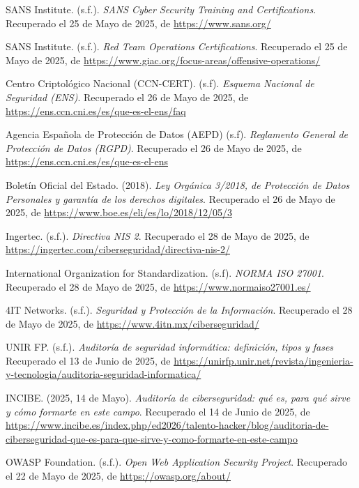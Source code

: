 \documentclass[a4paper, 11pt]{article}
\begin{document}
\begin{thebibliography}{99}
    SANS Institute. (s.f.). \textit{SANS Cyber Security Training and Certifications}. Recuperado el 25 de Mayo de 2025, de \url{https://www.sans.org/}

    SANS Institute. (s.f.). \textit{Red Team Operations Certifications}. Recuperado el 25 de Mayo de 2025, de \url{https://www.giac.org/focus-areas/offensive-operations/}

    Centro Criptológico Nacional (CCN-CERT). (s.f). \textit{Esquema Nacional de Seguridad (ENS)}. Recuperado el 26 de Mayo de 2025, de \url{https://ens.ccn.cni.es/es/que-es-el-ens/faq}

    Agencia Española de Protección de Datos (AEPD) (s.f). \textit{Reglamento General de Protección de Datos (RGPD)}. Recuperado el 26 de Mayo de 2025, de \url{https://ens.ccn.cni.es/es/que-es-el-ens}

    Boletín Oficial del Estado. (2018). \textit{Ley Orgánica 3/2018, de Protección de Datos Personales y garantía de los derechos digitales}. Recuperado el 26 de Mayo de 2025, de \url{https://www.boe.es/eli/es/lo/2018/12/05/3}

    Ingertec. (s.f.). \textit{Directiva NIS 2}. Recuperado el 28 de Mayo de 2025, de \url{https://ingertec.com/ciberseguridad/directiva-nis-2/}

    International Organization for Standardization. (s.f). \textit{NORMA ISO 27001}. Recuperado el 28 de Mayo de 2025, de \url{https://www.normaiso27001.es/}

    4IT Networks. (s.f.). \textit{Seguridad y Protección de la Información}. Recuperado el 28 de Mayo de 2025, de \url{https://www.4itn.mx/ciberseguridad/}

    UNIR FP. (s.f.). \textit{Auditoría de seguridad informática: definición, tipos y fases} Recuperado el 13 de Junio de 2025, de \url{https://unirfp.unir.net/revista/ingenieria-y-tecnologia/auditoria-seguridad-informatica/}

    INCIBE. (2025, 14 de Mayo). \textit{Auditoría de ciberseguridad: qué es, para qué sirve y cómo formarte en este campo}. Recuperado el 14 de Junio de 2025, de \url{https://www.incibe.es/index.php/ed2026/talento-hacker/blog/auditoria-de-ciberseguridad-que-es-para-que-sirve-y-como-formarte-en-este-campo}

    OWASP Foundation. (s.f.). \textit{Open Web Application Security Project}. Recuperado el 22 de Mayo de 2025, de \url{https://owasp.org/about/}


\end{thebibliography}
\end{document}
